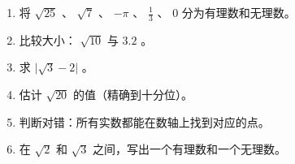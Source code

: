 \begin{practice}


\begin{enumerate}
  \item 将 $\sqrt{25}$ 、 $\sqrt{7}$ 、 $-\pi$ 、 $\frac{1}{3}$ 、 $0$ 分为有理数和无理数。
  \item 比较大小： $\sqrt{10}$ 与 $3.2$ 。
  \item 求 $\lvert \sqrt{3} - 2 \rvert$ 。
  \item 估计 $\sqrt{20}$ 的值（精确到十分位）。
  \item 判断对错：所有实数都能在数轴上找到对应的点。
  \item 在 $\sqrt{2}$ 和 $\sqrt{3}$ 之间，写出一个有理数和一个无理数。
\end{enumerate}


\end{practice}



